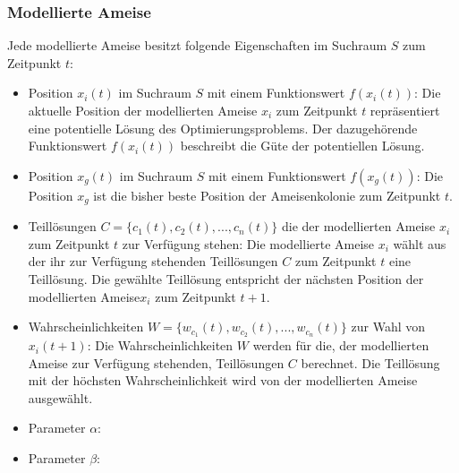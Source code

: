 \documentclass[a4paper, 11pt]{article}
\begin{document}
\subsubsection{Modellierte Ameise}
Jede modellierte Ameise besitzt folgende Eigenschaften im Suchraum $S$ zum Zeitpunkt $t$:
\begin{itemize}
	\item Position $x_{i}(t)$ im Suchraum $S$ mit einem Funktionswert $f(x_{i}(t))$: Die aktuelle Position der modellierten Ameise $x_{i}$ zum Zeitpunkt $t$ repräsentiert eine potentielle Lösung des Optimierungsproblems. Der dazugehörende Funktionswert $f(x_{i}(t))$ beschreibt die Güte der potentiellen Lösung.
	\item Position $x_{g}(t)$ im Suchraum $S$ mit einem Funktionswert $f(x_{g}(t))$: Die Position $x_{g}$ ist die bisher beste Position der Ameisenkolonie zum Zeitpunkt $t$.
	\item Teillösungen $C=\{c_{1}(t),c_{2}(t),...,c_{n}(t)\}$ die der modellierten Ameise $x_{i}$ zum Zeitpunkt $t$ zur Verfügung stehen: Die modellierte Ameise $x_{i}$ wählt aus der ihr zur Verfügung stehenden Teillösungen $C$ zum Zeitpunkt $t$ eine Teillösung. Die gewählte Teillösung entspricht der nächsten Position der modellierten Ameise$x_{i}$ zum Zeitpunkt $t+1$.
	\item Wahrscheinlichkeiten $W=\{w_{c_{1}}(t),w_{c_{2}}(t),...,w_{c_{n}}(t)\}$  zur Wahl von $x_{i}(t+1)$: Die Wahrscheinlichkeiten $W$ werden für die, der modellierten Ameise zur Verfügung stehenden, Teillösungen $C$ berechnet. Die Teillösung mit der höchsten Wahrscheinlichkeit wird von der modellierten Ameise ausgewählt.  	
	\item Parameter $\alpha$: 
	\item Parameter $\beta$: 
\end{itemize}
\newpage
\end{document}
